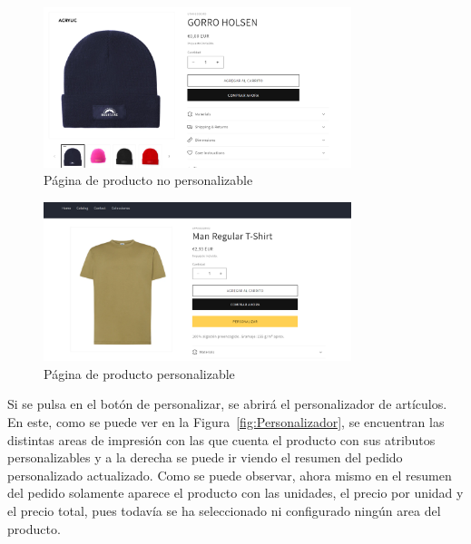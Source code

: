\documentclass[11pt]{article}
\begin{document}
\begin{figure}[H]
    \centering
    \includegraphics[width=0.8\textwidth]{imagenes/ManualUsuario/PaginaProductoSinPersonalizacion.png}
    \caption{\label{fig:ProductoNoPersonalizable}Página de producto no personalizable}
    \vspace{\fill}
\end{figure}

\begin{figure}[H]
    \centering
    \includegraphics[width=0.8\textwidth]{imagenes/ManualUsuario/PaginaProductoConPersonalizacion.png}
    \caption{\label{fig:ProductoPersonalizable}Página de producto personalizable}
    \vspace{\fill}
\end{figure}

Si se pulsa en el botón de personalizar, se abrirá el personalizador de artículos. En este, como se puede ver en la Figura~\ref{fig:Personalizador}, se encuentran
las distintas areas de impresión con las que cuenta el producto con sus atributos personalizables y a la derecha se puede ir viendo el resumen del pedido personalizado actualizado.
Como se puede observar, ahora mismo en el resumen del pedido solamente aparece el producto con las unidades, el precio por unidad y el precio total, pues todavía se ha seleccionado ni configurado
ningún area del producto.
\end{document}
